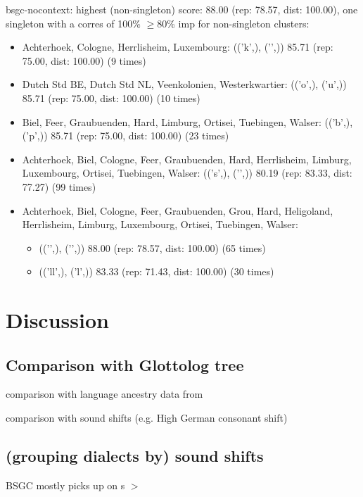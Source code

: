 \documentclass[a4paper]{article}
\begin{document}
bsgc-nocontext: highest (non-singleton) score: 88.00    (rep: 78.57, dist: 100.00), one singleton with a corres of 100\%
$\geq$80\% imp for non-singleton clusters:
\begin{itemize}
\item Achterhoek, Cologne, Herrlisheim, Luxembourg:
(('k',), ('\textesh',)) 85.71   (rep: 75.00, dist: 100.00)  (9 times) 
\item Dutch Std BE, Dutch Std NL, Veenkolonien, Westerkwartier:
(('o\textlengthmark',), ('u',)) 85.71   (rep: 75.00, dist: 100.00)  (10 times)
\item Biel, Feer, Graubuenden, Hard, Limburg, Ortisei, Tuebingen, Walser:
(('b',), ('p',))    85.71   (rep: 75.00, dist: 100.00)  (23 times)
\item Achterhoek, Biel, Cologne, Feer, Graubuenden, Hard, Herrlisheim, Limburg, Luxembourg, Ortisei, Tuebingen, Walser:
(('s',), ('\textesh',)) 80.19   (rep: 83.33, dist: 77.27)   (99 times)
\item Achterhoek, Biel, Cologne, Feer, Graubuenden, Grou, Hard, Heligoland, Herrlisheim, Limburg, Luxembourg, Ortisei, Tuebingen, Walser:
\begin{itemize}
\item (('\textg',), ('\textg',))    88.00   (rep: 78.57, dist: 100.00)  (65 times)
\item (('ll',), ('l',)) 83.33   (rep: 71.43, dist: 100.00)  (30 times)
\end{itemize}
\end{itemize}

\section{Discussion}


\subsection{Comparison with Glottolog tree}
comparison with language ancestry data from \citet{hammarstrom2018glottolog}

comparison with sound shifts (e.g. High German consonant shift)

\subsection{(grouping dialects by) sound shifts}

BSGC mostly picks up on s $>$ \textesh
\end{document}
